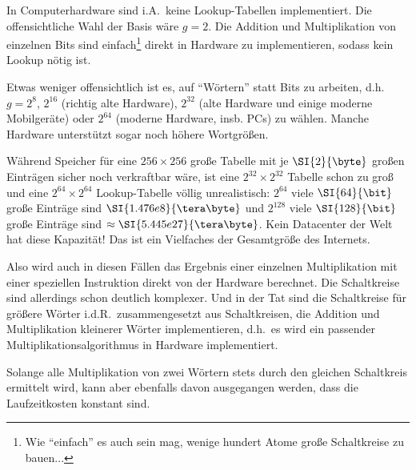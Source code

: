 \begin{remark}
    In Computerhardware sind i.A.\ keine Lookup-Tabellen implementiert. Die offensichtliche Wahl der Basis wäre $g=2$. Die Addition und Multiplikation von einzelnen Bits sind einfach\footnote{Wie \enquote{einfach} es auch sein mag, wenige hundert Atome große Schaltkreise zu bauen...} direkt in Hardware zu implementieren, sodass kein Lookup nötig ist.

    \smallskip
    Etwas weniger offensichtlich ist es, auf \enquote{Wörtern} statt Bits zu arbeiten, d.h. $g=2^8$, $2^{16}$ (richtig alte Hardware), $2^{32}$ (alte Hardware und einige moderne Mobilgeräte) oder $2^{64}$ (moderne Hardware, insb. PCs) zu wählen. Manche Hardware unterstützt sogar noch höhere Wortgrößen.

    \smallskip
    Während Speicher für eine $256\times 256$ große Tabelle mit je $\SI{2}{\byte}$ großen Einträgen sicher noch verkraftbar wäre, ist eine $2^{32}\times 2^{32}$ Tabelle schon zu groß und eine $2^{64}\times 2^{64}$  Lookup-Tabelle völlig unrealistisch: $2^{64}$ viele $\SI{64}{\bit}$ große Einträge sind $\SI{1.476e8}{\tera\byte}$ und $2^{128}$ viele $\SI{128}{\bit}$ große Einträge sind $\approx \SI{5.445e27}{\tera\byte}$. Kein Datacenter der Welt hat diese Kapazität! Das ist ein Vielfaches der Gesamtgröße des Internets.

    \smallskip
    Also wird auch in diesen Fällen das Ergebnis einer einzelnen Multiplikation mit einer speziellen Instruktion direkt von der Hardware berechnet. Die Schaltkreise sind allerdings schon deutlich komplexer. Und in der Tat sind die Schaltkreise für größere Wörter i.d.R.\ zusammengesetzt aus Schaltkreisen, die Addition und Multiplikation kleinerer Wörter implementieren, d.h.\ es wird ein passender Multiplikationsalgorithmus in Hardware implementiert.

    \smallskip
    Solange alle Multiplikation von zwei Wörtern stets durch den gleichen Schaltkreis ermittelt wird, kann aber ebenfalls davon ausgegangen werden, dass die Laufzeitkosten konstant sind.
\end{remark}

